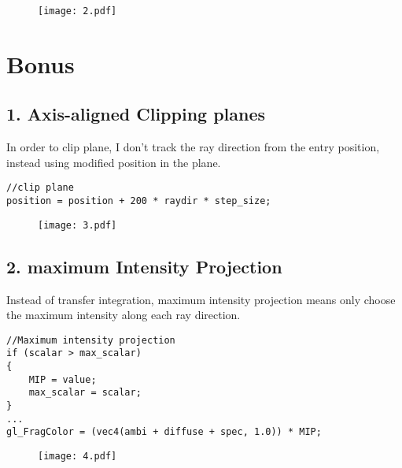 \documentclass[12pt,letterpaper,fleqn]{article}          %
\begin{document}
\begin{figure}[!htb]
\centering
\texttt{[image: 2.pdf]}
\end{figure}

\section{Bonus}
\subsection*{1. Axis-aligned Clipping planes}
In order to clip plane, I don't track the ray direction from the entry position, instead using modified position in the plane. 
\begin{lstlisting}
//clip plane
position = position + 200 * raydir * step_size;
\end{lstlisting}

\begin{figure}[!htb]
\centering
\texttt{[image: 3.pdf]}
\end{figure}


\subsection*{2. maximum Intensity Projection}
Instead of transfer integration, maximum intensity projection means only choose the maximum intensity along each ray direction.
\begin{lstlisting}
//Maximum intensity projection
if (scalar > max_scalar)
{
	MIP = value;
	max_scalar = scalar;
}
...
gl_FragColor = (vec4(ambi + diffuse + spec, 1.0)) * MIP;
\end{lstlisting}


			
\begin{figure}[!htb]
\centering
\texttt{[image: 4.pdf]}
\end{figure}
%




\end{document}

